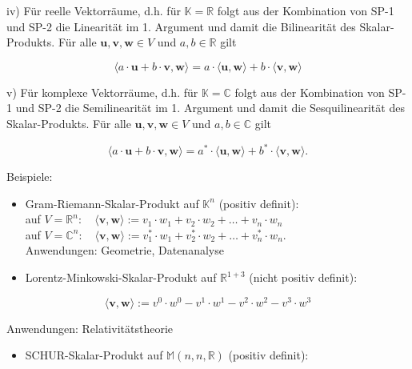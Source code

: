 \documentclass[10pt]{article}
\begin{document}
iv) Für reelle Vektorräume, d.h. für $\mathbb{K}=\mathbb{R}$ folgt aus der Kombination von SP-1 und SP-2 die Linearität im 1. Argument und damit die Bilinearität des Skalar-Produkts. Für alle $\mathbf{u}, \mathbf{v}, \mathbf{w} \in V$ und $a, b \in \mathbb{R}$ gilt


\begin{equation*}
\langle a \cdot \mathbf{u}+b \cdot \mathbf{v}, \mathbf{w}\rangle=a \cdot\langle\mathbf{u}, \mathbf{w}\rangle+b \cdot\langle\mathbf{v}, \mathbf{w}\rangle \tag{7.55}
\end{equation*}


v) Für komplexe Vektorräume, d.h. für $\mathbb{K}=\mathbb{C}$ folgt aus der Kombination von SP-1 und SP-2 die Semilinearität im 1. Argument und damit die Sesquilinearität des Skalar-Produkts. Für alle $\mathbf{u}, \mathbf{v}, \mathbf{w} \in V$ und $a, b \in \mathbb{C}$ gilt


\begin{equation*}
\langle a \cdot \mathbf{u}+b \cdot \mathbf{v}, \mathbf{w}\rangle=a^{*} \cdot\langle\mathbf{u}, \mathbf{w}\rangle+b^{*} \cdot\langle\mathbf{v}, \mathbf{w}\rangle . \tag{7.56}
\end{equation*}


Beispiele:

\begin{itemize}
  \item Gram-Riemann-Skalar-Produkt auf $\mathbb{K}^{n}$ (positiv definit):\\
auf $V=\mathbb{R}^{n}: \quad\langle\mathbf{v}, \mathbf{w}\rangle:=v_{1} \cdot w_{1}+v_{2} \cdot w_{2}+\ldots+v_{n} \cdot w_{n}$\\
auf $V=\mathbb{C}^{n}: \quad\langle\mathbf{v}, \mathbf{w}\rangle:=v_{1}^{*} \cdot w_{1}+v_{2}^{*} \cdot w_{2}+\ldots+v_{n}^{*} \cdot w_{n}$.\\
Anwendungen: Geometrie, Datenanalyse
  \item Lorentz-Minkowski-Skalar-Produkt auf $\mathbb{R}^{1+3}$ (nicht positiv definit):
\end{itemize}


\begin{equation*}
\langle\mathbf{v}, \mathbf{w}\rangle:=v^{0} \cdot w^{0}-v^{1} \cdot w^{1}-v^{2} \cdot w^{2}-v^{3} \cdot w^{3} \tag{7.59}
\end{equation*}


Anwendungen: Relativitätstheorie

\begin{itemize}
  \item SCHUR-Skalar-Produkt auf $\mathbb{M}(n, n, \mathbb{R})$ (positiv definit):
\end{itemize}
\end{document}
